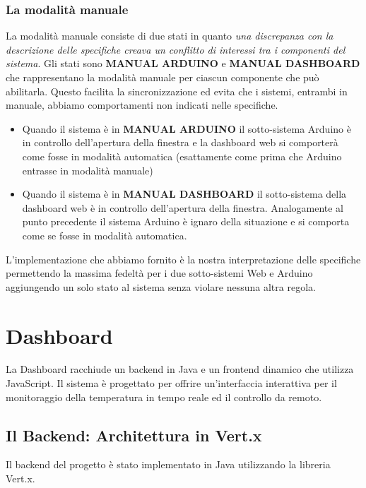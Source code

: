 \documentclass{report}
\begin{document}
\subsection{La modalità manuale}
La modalità manuale consiste di due stati in quanto \textit{una discrepanza con la descrizione delle specifiche creava un conflitto di interessi tra i componenti del sistema}. 
Gli stati sono \textbf{MANUAL ARDUINO} e \textbf{MANUAL DASHBOARD} che rappresentano la modalità manuale per ciascun componente che può abilitarla. Questo facilita la sincronizzazione ed evita che i sistemi, entrambi in manuale, abbiamo comportamenti non indicati nelle specifiche. \\
\begin{itemize}
    \item Quando il sistema è in \textbf{MANUAL ARDUINO} il sotto-sistema Arduino è in controllo dell'apertura della finestra e la dashboard web si comporterà come fosse in modalità automatica (esattamente come prima  che Arduino entrasse in modalità manuale)
    \item Quando il sistema è in \textbf{MANUAL DASHBOARD} il sotto-sistema della dashboard web è in controllo dell'apertura della finestra. Analogamente al punto precedente il sistema Arduino è ignaro della situazione e si comporta come se fosse in modalità automatica. 
\end{itemize}
L'implementazione che abbiamo fornito è la nostra interpretazione delle specifiche permettendo la massima fedeltà per i due sotto-sistemi Web e Arduino aggiungendo un solo stato al sistema senza violare nessuna altra regola. 
%
%
\chapter{Dashboard}
\par {
La Dashboard racchiude un backend in Java e un frontend dinamico che utilizza JavaScript. Il sistema è progettato per offrire un’interfaccia interattiva per il monitoraggio della temperatura  in tempo reale ed il controllo da remoto.
}

\section{Il Backend: Architettura in Vert.x}
Il backend del progetto è stato implementato in Java utilizzando la libreria Vert.x.
\end{document}
